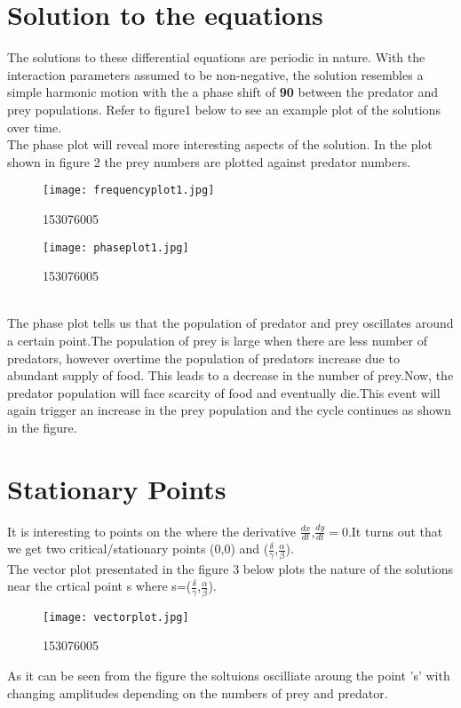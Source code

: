 \documentclass[12pt,a4paper]{article}
\begin{document}
	\section{Solution to the equations}
	The solutions to these differential equations are periodic in nature. With the interaction parameters assumed to be non-negative, the solution resembles a simple harmonic motion with the a phase shift of \textbf{90\textdegree}  between the predator and prey populations. Refer to figure1 below to see an example plot of the solutions over time.
	\\
	The phase plot will reveal more interesting aspects of the solution. In the plot shown in figure 2 the prey numbers are plotted against predator numbers.
	\begin{figure}[p]
		\centering
		\texttt{[image: frequencyplot1.jpg]}
		\caption{153076005}
		\label{fig:freqeuncyplot1}
	\end{figure}
	\begin{figure}[!ht]
		\centering
		\texttt{[image: phaseplot1.jpg]}
		\caption{153076005}
		\label{fig:phasespaceplot1}
	\end{figure}
	\\
	The phase plot tells us that the population of predator and prey oscillates around a certain point.The population of prey is large when there are less number of predators, however overtime the population of predators increase due to abundant supply of food. This leads to a decrease in the number of prey.Now, the predator population will face scarcity of food and eventually die.This event will again trigger an increase in the prey population and the cycle continues as shown in the figure.
		
	\section{Stationary Points}
	It is interesting to points on the where the derivative $\frac{dx}{dt}$,$\frac{dy}{dt}=0$.It turns out that we get two critical/stationary points (0,0) and ($\frac{\delta}{\gamma}$,$\frac{\alpha}{\beta}$).
	\\
	The vector plot presentated in the figure 3 below plots the nature of the solutions near the crtical point s where s=($\frac{\delta}{\gamma}$,$\frac{\alpha}{\beta}$).
	\begin{figure}[!ht]
		\centering
		\texttt{[image: vectorplot.jpg]}
		\caption{153076005}
		\label{fig:vectorplot1}
	\end{figure}
	As it can be seen from the figure the soltuions oscilliate aroung the point 's' with changing amplitudes depending on the numbers of prey and predator.\cite{Mathnathan}
	
\end{document}
